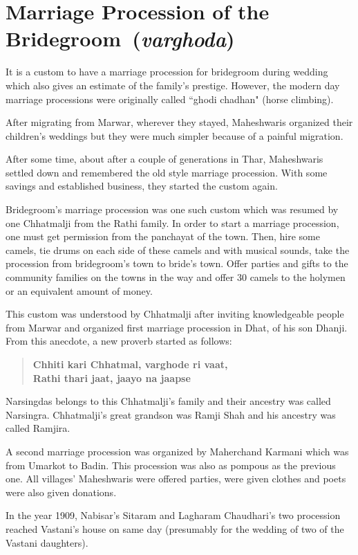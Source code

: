 \chapter{Marriage Procession of the Bridegroom~(\textit{varghoda})}
It is a custom to have a marriage procession for bridegroom during wedding which
also gives an estimate of the family's prestige. However, the modern day
marriage processions were originally called ``ghodi chadhan" (horse climbing).

After migrating from Marwar, wherever they stayed, Maheshwaris organized their
children's weddings but they were much simpler because of a painful migration.

After some time, about after a couple of generations in Thar, Maheshwaris
settled down and remembered the old style marriage procession. With some
savings and established business, they started the custom again.

Bridegroom's marriage procession was one such custom which was resumed by one
Chhatmalji from the Rathi family. In order to start a marriage procession, one
must get permission from the panchayat of the town. Then, hire some camels, tie
drums on each side of these camels and with musical sounds, take the procession
from bridegroom's town to bride's town. Offer parties and gifts to the community
families on the towns in the way and offer 30 camels to the holymen or an
equivalent amount of money.

This custom was understood by Chhatmalji after inviting knowledgeable people
from Marwar and organized first marriage procession in Dhat, of his son Dhanji.
From this anecdote, a new proverb started as follows:

\begin{quote}
\textbf{Chhiti kari Chhatmal, varghode ri vaat,\\
Rathi thari jaat, jaayo na jaapse}
\end{quote}

Narsingdas belongs to this Chhatmalji's family and their ancestry was called
Narsingra. Chhatmalji's great grandson was Ramji Shah and his ancestry was
called Ramjira.

A second marriage procession was organized by Maherchand Karmani which was from
Umarkot to Badin. This procession was also as pompous as the previous one. All
villages' Maheshwaris were offered parties, were given clothes and poets were
also given donations.

In the year 1909, Nabisar's Sitaram and Lagharam Chaudhari's two procession
reached Vastani's house on same day (presumably for the wedding of two of the
Vastani daughters).

